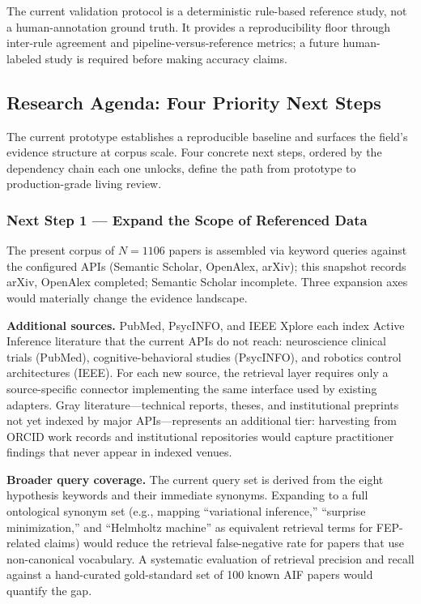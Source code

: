 \documentclass[
  english,
]{article}
\begin{document}
The current validation protocol is a deterministic rule-based reference
study, not a human-annotation ground truth. It provides a
reproducibility floor through inter-rule agreement and
pipeline-versus-reference metrics; a future human-labeled study is
required before making accuracy claims.

\subsection{Research Agenda: Four Priority Next
Steps}\label{sec:next_steps}

The current prototype establishes a reproducible baseline and surfaces
the field's evidence structure at corpus scale. Four concrete next
steps, ordered by the dependency chain each one unlocks, define the path
from prototype to production-grade living review.

\subsubsection{Next Step 1 --- Expand the Scope of Referenced
Data}\label{next-step-1-expand-the-scope-of-referenced-data}

The present corpus of \(N = 1106\) papers is assembled via keyword
queries against the configured APIs (Semantic Scholar, OpenAlex, arXiv);
this snapshot records arXiv, OpenAlex completed; Semantic Scholar
incomplete. Three expansion axes would materially change the evidence
landscape.

\textbf{Additional sources.} PubMed, PsycINFO, and IEEE Xplore each
index Active Inference literature that the current APIs do not reach:
neuroscience clinical trials (PubMed), cognitive-behavioral studies
(PsycINFO), and robotics control architectures (IEEE). For each new
source, the retrieval layer requires only a source-specific connector
implementing the same 
interface used by existing adapters. Gray literature---technical
reports, theses, and institutional preprints not yet indexed by major
APIs---represents an additional tier: harvesting from ORCID work records
and institutional repositories would capture practitioner findings that
never appear in indexed venues.

\textbf{Broader query coverage.} The current query set is derived from
the eight hypothesis keywords and their immediate synonyms. Expanding to
a full ontological synonym set (e.g., mapping ``variational inference,''
``surprise minimization,'' and ``Helmholtz machine'' as equivalent
retrieval terms for FEP-related claims) would reduce the retrieval
false-negative rate for papers that use non-canonical vocabulary. A
systematic evaluation of retrieval precision and recall against a
hand-curated gold-standard set of 100 known AIF papers would quantify
the gap.
\end{document}
